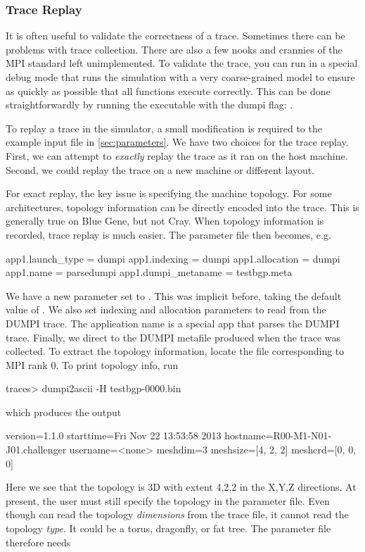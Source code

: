 \subsubsection{Trace Replay}
\label{subsec:dumpi:tracereplay}
It is often useful to validate the correctness of a trace.  Sometimes there can be problems with trace collection. 
There are also a few nooks and crannies of the MPI standard left unimplemented.
To validate the trace, you can run in a special debug mode that runs the simulation with a very coarse-grained model
to ensure as quickly as possible that all functions execute correctly.
This can be done straightforwardly by running the executable with the dumpi flag: .

To replay a trace in the simulator, a small modification is required to the example input file in \ref{sec:parameters}.
We have two choices for the trace replay.  First, we can attempt to \emph{exactly} replay the trace as it ran on the host machine.
Second, we could replay the trace on a new machine or different layout.

For exact replay, the key issue is specifying the machine topology.
For some architectures, topology information can be directly encoded into the trace.
This is generally true on Blue Gene, but not Cray.
When topology information is recorded, trace replay is much easier.
The parameter file then becomes, e.g.

\begin{ViFile}
app1.launch_type = dumpi
app1.indexing = dumpi
app1.allocation = dumpi
app1.name = parsedumpi
app1.dumpi_metaname = testbgp.meta
\end{ViFile}
We have a new parameter  set to .
This was implicit before, taking the default value of .
We also set indexing and allocation parameters to read from the DUMPI trace.
The application name is a special app that parses the DUMPI trace.
Finally, we direct \sstmacro to the DUMPI metafile produced when the trace was collected.
To extract the topology information, locate the  file corresponding to MPI rank 0.
To print topology info, run

\begin{ShellCmd}
traces> dumpi2ascii -H testbgp-0000.bin 
\end{ShellCmd}
which produces the output

\begin{ViFile}
version=1.1.0
starttime=Fri Nov 22 13:53:58 2013
hostname=R00-M1-N01-J01.challenger
username=<none>
meshdim=3
meshsize=[4, 2, 2]
meshcrd=[0, 0, 0]
\end{ViFile}
Here we see that the topology is 3D with extent 4,2,2 in the X,Y,Z directions.
At present, the user must still specify the topology in the parameter file.
Even though \sstmacro can read the topology \emph{dimensions} from the trace file,
it cannot read the topology \emph{type}.  It could be a torus, dragonfly, or fat tree.
The parameter file therefore needs

